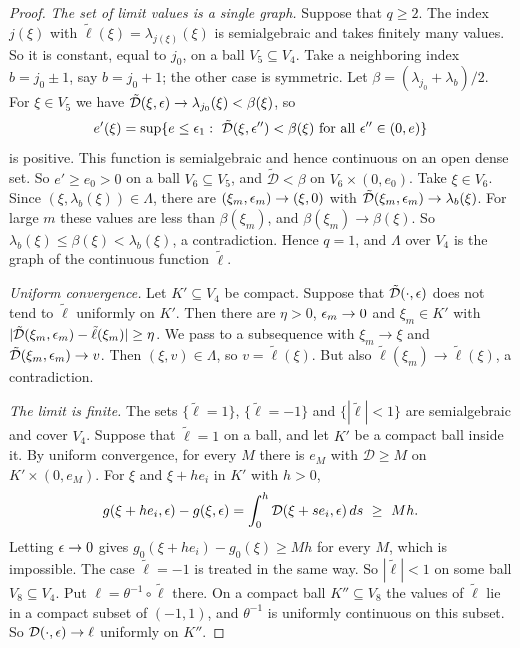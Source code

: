 \begin{proof}
\emph{The set of limit values is a single graph.} Suppose that $q\ge2$. The index $j(\xi)$ with $\tilde\ell(\xi)=\lambda_{j(\xi)}(\xi)$ is semialgebraic and takes finitely many values. So it is constant, equal to $j_0$, on a ball $V_5\subseteq V_4$. Take a neighboring index $b=j_0\pm1$, say $b=j_0+1$; the other case is symmetric. Let $\beta=(\lambda_{j_0}+\lambda_b)/2$. For $\xi\in V_5$ we have $\tilde{\mathcal D}(\xi,\epsilon)\to\lambda_{j_0}(\xi)<\beta(\xi)$, so
\[
e'(\xi)=\sup\{e\le\epsilon_1:\ \tilde{\mathcal D}(\xi,\epsilon'')<\beta(\xi)\text{ for all }\epsilon''\in(0,e)\}
\]
is positive. This function is semialgebraic and hence continuous on an open dense set. So $e'\ge e_0>0$ on a ball $V_6\subseteq V_5$, and $\tilde{\mathcal D}<\beta$ on $V_6\times(0,e_0)$. Take $\xi\in V_6$. Since $(\xi,\lambda_b(\xi))\in\Lambda$, there are $(\xi_m,\epsilon_m)\to(\xi,0)$ with $\tilde{\mathcal D}(\xi_m,\epsilon_m)\to\lambda_b(\xi)$. For large $m$ these values are less than $\beta(\xi_m)$, and $\beta(\xi_m)\to\beta(\xi)$. So $\lambda_b(\xi)\le\beta(\xi)<\lambda_b(\xi)$, a contradiction. Hence $q=1$, and $\Lambda$ over $V_4$ is the graph of the continuous function $\tilde\ell$.

\emph{Uniform convergence.} Let $K'\subseteq V_4$ be compact. Suppose that $\tilde{\mathcal D}(\cdot,\epsilon)$ does not tend to $\tilde\ell$ uniformly on $K'$. Then there are $\eta>0$, $\epsilon_m\to0$ and $\xi_m\in K'$ with $|\tilde{\mathcal D}(\xi_m,\epsilon_m)-\tilde\ell(\xi_m)|\ge\eta$. We pass to a subsequence with $\xi_m\to\xi$ and $\tilde{\mathcal D}(\xi_m,\epsilon_m)\to v$. Then $(\xi,v)\in\Lambda$, so $v=\tilde\ell(\xi)$. But also $\tilde\ell(\xi_m)\to\tilde\ell(\xi)$, a contradiction.

\emph{The limit is finite.} The sets $\{\tilde\ell=1\}$, $\{\tilde\ell=-1\}$ and $\{|\tilde\ell|<1\}$ are semialgebraic and cover $V_4$. Suppose that $\tilde\ell=1$ on a ball, and let $K'$ be a compact ball inside it. By uniform convergence, for every $M$ there is $e_M$ with $\mathcal D\ge M$ on $K'\times(0,e_M)$. For $\xi$ and $\xi+he_i$ in $K'$ with $h>0$,
\begin{equation}\label{eq:ftc}
g(\xi+he_i,\eps)-g(\xi,\eps)=\int_0^h\mathcal D(\xi+se_i,\eps)\,ds\ \ge\ Mh .
\end{equation}
Letting $\epsilon\to0$ gives $g_0(\xi+he_i)-g_0(\xi)\ge Mh$ for every $M$, which is impossible. The case $\tilde\ell=-1$ is treated in the same way. So $|\tilde\ell|<1$ on some ball $V_8\subseteq V_4$. Put $\ell=\theta^{-1}\circ\tilde\ell$ there. On a compact ball $K''\subseteq V_8$ the values of $\tilde\ell$ lie in a compact subset of $(-1,1)$, and $\theta^{-1}$ is uniformly continuous on this subset. So $\mathcal D(\cdot,\epsilon)\to\ell$ uniformly on $K''$.


\end{proof}
